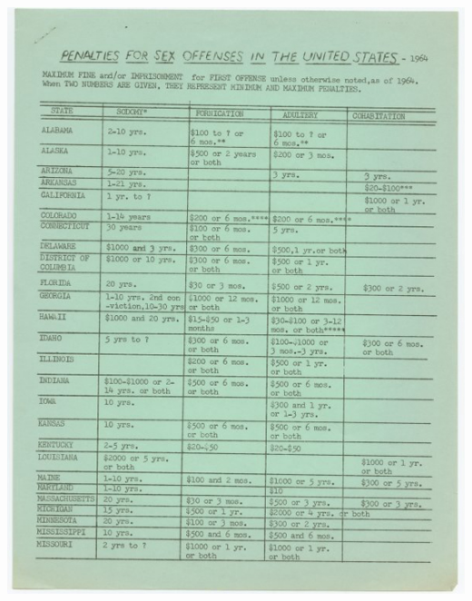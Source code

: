 \begin{refsection}
\begin{marginfigure}
 \begin{center}

     \includegraphics{../PrimarySourceMaterials/MattachineSocietyPamphlet1964-A.jpg}

\end{center}
\end{marginfigure}
\end{refsection}
